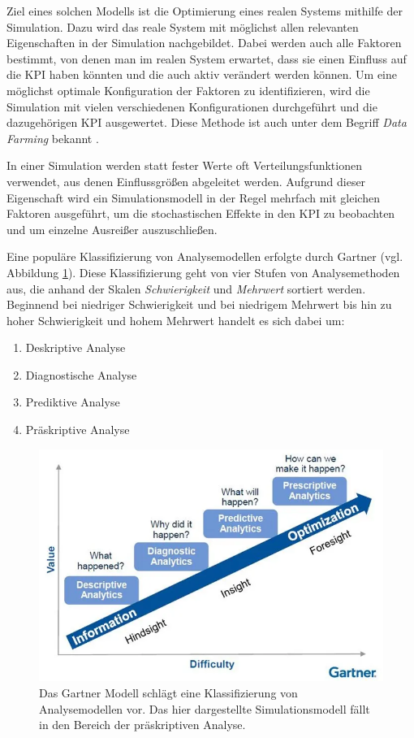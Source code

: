 \documentclass[11pt,a4paper]{article}
\begin{document}
Ziel eines solchen Modells ist die Optimierung eines realen Systems mithilfe der Simulation.
Dazu wird das reale System mit möglichst allen relevanten Eigenschaften in der Simulation nachgebildet.
Dabei werden auch alle Faktoren bestimmt, von denen man im realen System erwartet, dass sie einen Einfluss auf die KPI
haben könnten und die auch aktiv verändert werden können.
Um eine möglichst optimale Konfiguration der Faktoren zu identifizieren, wird die Simulation 
mit vielen verschiedenen Konfigurationen durchgeführt und die dazugehörigen KPI ausgewertet.
Diese Methode ist auch unter dem Begriff \emph{Data Farming} bekannt \cite{8632383}.

In einer Simulation werden statt fester Werte oft Verteilungsfunktionen verwendet, aus denen Einflussgrößen abgeleitet werden. 
Aufgrund dieser Eigenschaft wird ein Simulationsmodell in der Regel mehrfach
mit gleichen Faktoren ausgeführt, um die stochastischen Effekte in den KPI zu beobachten und
um einzelne Ausreißer auszuschließen. 

Eine populäre Klassifizierung von Analysemodellen erfolgte durch Gartner \cite{Gartner} (vgl. Abbildung \ref{fig:gartner-modell}).
Diese Klassifizierung geht von vier Stufen von Analysemethoden aus, die anhand der Skalen \emph{Schwierigkeit} und \emph{Mehrwert} sortiert werden.
Beginnend bei niedriger Schwierigkeit und bei niedrigem Mehrwert bis hin zu hoher Schwierigkeit und hohem Mehrwert
handelt es sich dabei um:
\begin{enumerate}
	\item Deskriptive Analyse
	\item Diagnostische Analyse
	\item Prediktive Analyse
	\item Präskriptive Analyse
\end{enumerate}

\begin{figure}
	\label{fig:gartner-modell}
	\centering
	\includegraphics[width=\textwidth]{media/analytic-maturity.png}
	\caption{
		Das Gartner Modell schlägt eine Klassifizierung von Analysemodellen vor.
		Das hier dargestellte Simulationsmodell fällt in den Bereich der 
		präskriptiven Analyse. 
	}
\end{figure}
\end{document}
